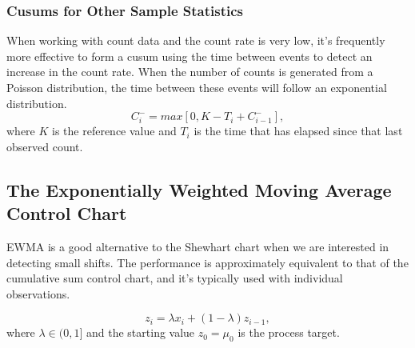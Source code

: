 \documentclass[12pt,oneside,a4paper]{article}
\numberwithin{equation}{section}
\begin{document}
\subsubsection{Cusums for Other Sample Statistics}
When working with count data and the count rate is very low, it's frequently more effective to form a cusum using the time between events to detect an increase in the count rate.  When the number of counts is generated from a Poisson distribution, the time between these events will follow an exponential distribution. 
\begin{equation*}
C_i^- = max[0, K - T_i + C_{i-1}^-],
\end{equation*}
where $K$ is the reference value and $T_i$ is the time that has elapsed since that last observed count.

\subsection{The Exponentially Weighted Moving Average Control Chart}
EWMA is a good alternative to the Shewhart chart when we are interested in detecting small shifts. The performance is approximately equivalent to that of the cumulative sum control chart, and it's typically used with individual observations.


\begin{equation*}
z_i = \lambda x_i + (1 - \lambda) z_{i-1}, 
\end{equation*}  
where $\lambda \in (0, 1]$ and the starting value $z_0 = \mu_0$ is the process target. 

\end{document}

